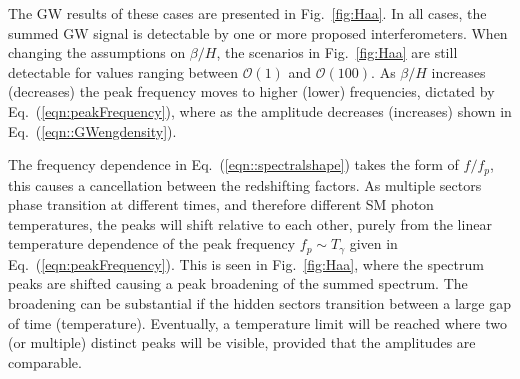 \documentclass[nofootinbib,twocolumn,preprintnumbers]{revtex4-1}
\begin{document}
The GW results of these cases are presented in Fig.~\ref{fig:Haa}. In all cases, the summed GW signal is detectable by one or more proposed interferometers. When changing the assumptions on $\beta/H$, the scenarios in Fig.~\ref{fig:Haa} are still detectable for values ranging between $\mathcal{O}(1)$ and $\mathcal{O}(100)$. As $\beta/H$ increases (decreases) the peak frequency moves to higher (lower) frequencies, dictated by Eq.~(\ref{eqn:peakFrequency}), where as the amplitude decreases (increases) shown in Eq.~(\ref{eqn::GWengdensity}).

The frequency dependence in Eq.~(\ref{eqn::spectralshape}) takes the form of $f/f_{p}$, this causes a cancellation between the redshifting factors. As multiple sectors phase transition at different times, and therefore different SM photon temperatures, the peaks will shift relative to each other, purely from the linear temperature dependence of the peak frequency $f_{p} \sim T_{\gamma}$ given in Eq.~(\ref{eqn:peakFrequency}).  This is seen in Fig.~\ref{fig:Haa}, where the spectrum peaks are shifted causing a peak broadening of the summed spectrum. The broadening can be substantial if the hidden sectors transition between a large gap of time (temperature). Eventually, a temperature limit will be reached where two (or multiple) distinct peaks will be visible, provided that the amplitudes are comparable. 
\end{document}
